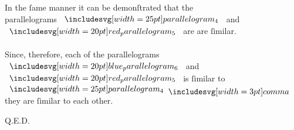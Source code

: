 \documentclass[11pt,preview]{standalone}
\begin{document}
\begin{center}
    In the ſame manner it can be demonſtrated that the\\
    parallelograms $\img{parallelogram_4}$ and $\img[0][0][20]{red_parallelogram_5}$ are are ſimilar.\\
    \hfill\\
    Since, therefore, each of the parallelograms\\
    $\img[0][0][20]{blue_parallelogram_6}$ and $\img[0][0][20]{red_parallelogram_5}$ is ſimilar to $\img{parallelogram_4} \bcomma$\\
    they are ſimilar to each other.
\end{center}

\hfill Q.E.D.
\end{document}
